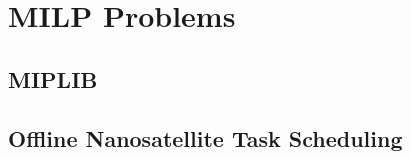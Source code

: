 

\chapter{MILP Problems}\label{chap:milp-problems}

\section{MIPLIB}

\section{Offline Nanosatellite Task Scheduling}

